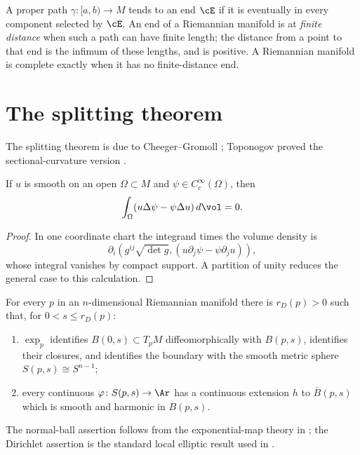 A proper path $\gamma\colon[a,b)\to M$ tends to an end $\cE$ if it is
eventually in every component selected by $\cE$. An end of a Riemannian
manifold is at \emph{finite distance} when such a path can have finite
length; the distance from a point to that end is the infimum of these
lengths, and is positive. A Riemannian manifold is complete exactly when it has no
finite-distance end.


\section{The splitting theorem}

The splitting theorem is due to Cheeger--Gromoll
\cite{CheegerGromoll2}; Toponogov proved the sectional-curvature version
\cite{Toponogov}.

\begin{lemma}
\label{lem:green-identity-compact-support}
\leanok

If $u$ is smooth on an open $\Omega\subset M$ and
$\psi\in C_c^\infty(\Omega)$, then
$$\int_\Omega(u\Delta\psi-\psi\Delta u)\,d\vol=0.$$
\end{lemma}
\begin{proof}
\sketch
{}
In one coordinate chart the integrand times the volume density is
$$\partial_i\!\left(g^{ij}\sqrt{\det g},
(u\partial_j\psi-\psi\partial_ju)\right),$$
whose integral vanishes by compact support. A partition of unity reduces
the general case to this calculation.
\end{proof}

\begin{claim}
\label{claim:dirichlet-problem-small-balls}

For every $p$ in an $n$-dimensional Riemannian manifold there is
$r_D(p)>0$ such that, for $0<s\le r_D(p)$:
\begin{enumerate}
\item $\exp_p$ identifies $B(0,s)\subset T_pM$ diffeomorphically with
$B(p,s)$, identifies their closures, and identifies the boundary with
the smooth metric sphere $S(p,s)\cong S^{n-1}$;
\item every continuous $\varphi\colon S(p,s)\to\Ar$ has a continuous
extension $h$ to $\overline B(p,s)$ which is smooth and harmonic in
$B(p,s)$.
\end{enumerate}
The normal-ball assertion follows from the exponential-map theory in
\cite{doCarmo}; the Dirichlet assertion is the standard local elliptic
result used in \cite{Petersen}.
\end{claim}

